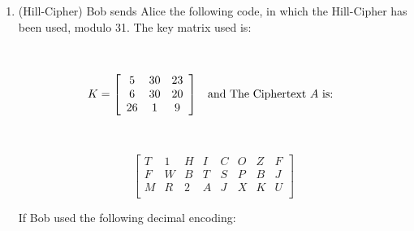 \documentclass[12pt,emtex]{article}
\begin{document}
\begin{enumerate}
	    \vspace{8mm}  \hrule	    \vspace{8mm}  \hrule	    \vspace{8mm}  \hrule
	    

\newpage

\

\vspace{-25mm}
          \item   (Hill-Cipher) Bob sends Alice the following code, in which the Hill-Cipher has been used, modulo 31. The key matrix used is:
    
          \vspace{-6mm}
            
            \
            
             	\[ K = 
            \left[
            	\begin{array}{cccccccccc}
                    5	&	30	& 	23 \\
                    6	&	30	& 	20 \\
                    26	&	1	&	9 \\
            \end{array}
            \right]
            \hspace{3mm}
             \mbox{and The Ciphertext $A$ is:  }
             \medskip
            \] 
          
          \
          
          \vspace{-6mm}
            
         \[  
            \left[
            \begin{array}{ccccccccccccccc}
T	&	1	&	H	&	I	&	C	&	O	&	Z	&	F	\\
F	&	W	&	B	&	T	&	S	&	P	&	B	&	J	\\
M	&	R	&	2	&	A	&	J	&	X	&	K	&	U	\\
           \end{array}
            \right]
            \]
            
                \medskip
           
          \hspace{-10mm}   
             If Bob used the following decimal encoding:
          

\end{enumerate}
\end{document}
